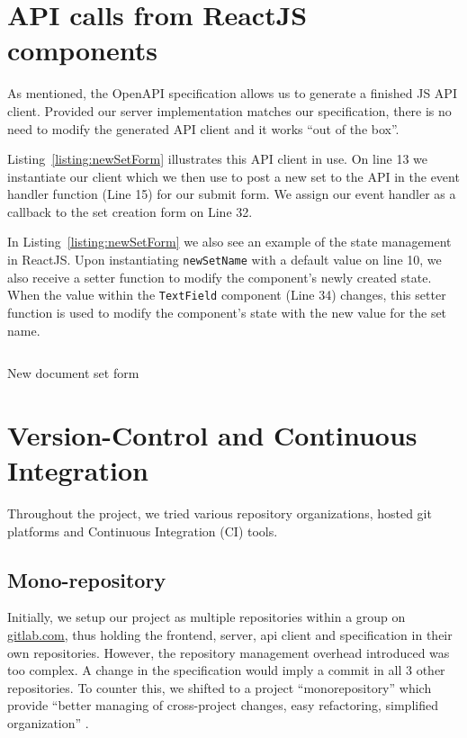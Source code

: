 \documentclass[\version]{l4proj}
\newenvironment{longlisting}{\captionsetup{type=listing}\vspace{10pt}}{}
\begin{document}
\section{API calls from ReactJS components}

As mentioned, the OpenAPI specification allows us to generate a finished JS API client.
Provided our server implementation matches our specification, there is no need to modify the generated API client and it works ``out of the box''.

Listing~\ref{listing:newSetForm} illustrates this API client in use.
On line 13 we instantiate our client which we then use to post a new set to the API in the event handler function (Line 15) for our submit form.
We assign our event handler as a callback to the set creation form on Line 32.

In Listing~\ref{listing:newSetForm} we also see an example of the state management in ReactJS.
Upon instantiating \verb|newSetName| with a default value on line 10, we also receive a setter function to modify the component's newly created state.
When the value within the \verb|TextField| component (Line 34) changes, this setter function is used to modify the component's state with the new value for the set name.

\begin{longlisting}
    \inputminted{jsx}{code/newSetForm.jsx}
    \caption{New document set form}\label{listing:newSetForm}
\end{longlisting}

\section{Version-Control and Continuous Integration}

Throughout the project, we tried various repository organizations, hosted git platforms and Continuous Integration (CI) tools.

\subsection{Mono-repository}

Initially, we setup our project as multiple repositories within a group on \href{https://gitlab.com/harpocrates-app}{gitlab.com}, thus holding the frontend, server, api client and specification in their own repositories.
However, the repository management overhead introduced was too complex. A change in the specification would imply a commit in all 3 other repositories.
To counter this, we shifted to a project ``monorepository'' which provide ``better managing of cross-project changes, easy refactoring, simplified organization'' \autocite[1]{britoMonoreposMultivocalLiterature2018}.
\end{document}
